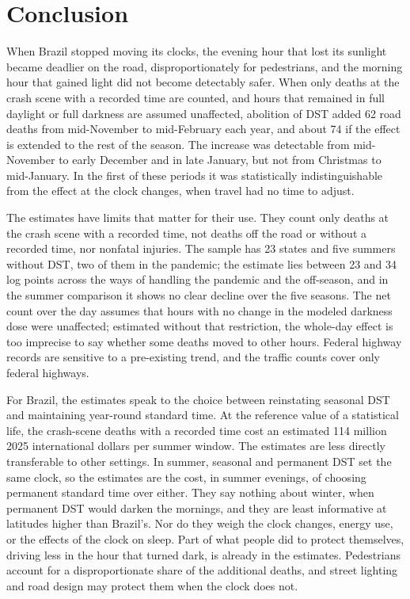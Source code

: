 \section{Conclusion}\label{sec:conclusion}

When Brazil stopped moving its clocks, the evening hour that lost its sunlight became deadlier on the road, disproportionately for pedestrians, and the morning hour that gained light did not become detectably safer. When only deaths at the crash scene with a recorded time are counted, and hours that remained in full daylight or full darkness are assumed unaffected, abolition of DST added 62 road deaths from mid-November to mid-February each year, and about 74 if the effect is extended to the rest of the season. The increase was detectable from mid-November to early December and in late January, but not from Christmas to mid-January. In the first of these periods it was statistically indistinguishable from the effect at the clock changes, when travel had no time to adjust.

The estimates have limits that matter for their use. They count only deaths at the crash scene with a recorded time, not deaths off the road or without a recorded time, nor nonfatal injuries. The sample has 23 states and five summers without DST, two of them in the pandemic; the estimate lies between 23 and 34 log points across the ways of handling the pandemic and the off-season, and in the summer comparison it shows no clear decline over the five seasons. The net count over the day assumes that hours with no change in the modeled darkness dose were unaffected; estimated without that restriction, the whole-day effect is too imprecise to say whether some deaths moved to other hours. Federal highway records are sensitive to a pre-existing trend, and the traffic counts cover only federal highways.

For Brazil, the estimates speak to the choice between reinstating seasonal DST and maintaining year-round standard time. At the reference value of a statistical life, the crash-scene deaths with a recorded time cost an estimated 114 million 2025 international dollars per summer window. The estimates are less directly transferable to other settings. In summer, seasonal and permanent DST set the same clock, so the estimates are the cost, in summer evenings, of choosing permanent standard time over either. They say nothing about winter, when permanent DST would darken the mornings, and they are least informative at latitudes higher than Brazil's. Nor do they weigh the clock changes, energy use, or the effects of the clock on sleep. Part of what people did to protect themselves, driving less in the hour that turned dark, is already in the estimates. Pedestrians account for a disproportionate share of the additional deaths, and street lighting and road design may protect them when the clock does not.
